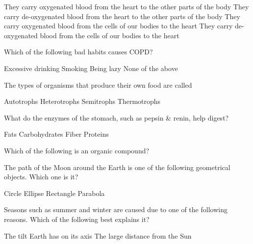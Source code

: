 \documentclass[12pt,addpoints]{exam}
\begin{document}
{{{\begin{questions}
					\begin{choices}
						\choice They carry oxygenated blood from the heart to the other parts of the body
						\choice They carry de-oxygenated blood from the heart to the other parts of the body
						\choice They carry oxygenated blood from the cells of our bodies to the heart
						\choice They carry de-oxygenated blood from the cells of our bodies to the heart
					\end{choices}
					\question Which of the following bad habits causes COPD? \\
					\begin{oneparchoices}
						\choice Excessive drinking
						\choice Smoking
						\choice Being lazy
						\choice None of the above
					\end{oneparchoices}			
					\question The types of organisms that produce their own food are called \\
					\begin{oneparchoices}
						\choice Autotrophs
						\choice Heterotrophs
						\choice Semitrophs
						\choice Thermotrophs
					\end{oneparchoices}	
					\question What do the enzymes of the stomach, such as pepsin \& renin, help digest? \\
					\begin{oneparchoices}
						\choice Fats
						\choice Carbohydrates
						\choice Fiber
						\choice Proteins
					\end{oneparchoices}	
					\question Which of the following is an organic compound? \\
					\begin{oneparchoices}
						\choice \ch{C_2H_{2}}
						\choice \ch{C_3H_{8}}
						\choice \ch{C_4H_{10}}
						\choice \ch{CO_2}
					\end{oneparchoices}	
					\question The path of the Moon around the Earth is one of the following geometrical objects. Which one is it? \\
					\begin{oneparchoices}
						\choice Circle
						\choice Ellipse
						\choice Rectangle
						\choice Parabola
					\end{oneparchoices}
					\question Seasons such as summer and winter are caused due to one of the following reasons. Which of the following best explains it? \\
					\begin{oneparchoices}
						\choice The tilt Earth has on its axis
						\choice The large distance from the Sun \\

\end{oneparchoices}
\end{questions}}}}
\end{document}
